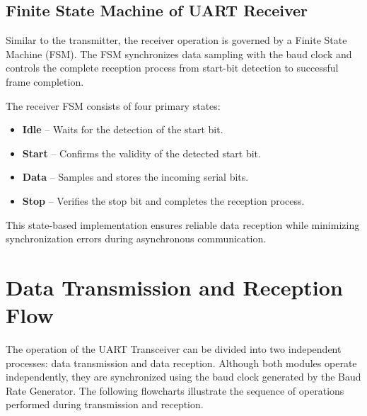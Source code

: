 
\subsection{Finite State Machine of UART Receiver}

Similar to the transmitter, the receiver operation is governed by a Finite State Machine (FSM). The FSM synchronizes data sampling with the baud clock and controls the complete reception process from start-bit detection to successful frame completion.

The receiver FSM consists of four primary states:

\begin{itemize}

\item \textbf{Idle} – Waits for the detection of the start bit.

\item \textbf{Start} – Confirms the validity of the detected start bit.

\item \textbf{Data} – Samples and stores the incoming serial bits.

\item \textbf{Stop} – Verifies the stop bit and completes the reception process.

\end{itemize}

This state-based implementation ensures reliable data reception while minimizing synchronization errors during asynchronous communication.

\clearpage


\section{Data Transmission and Reception Flow}

The operation of the UART Transceiver can be divided into two independent processes: data transmission and data reception. Although both modules operate independently, they are synchronized using the baud clock generated by the Baud Rate Generator. The following flowcharts illustrate the sequence of operations performed during transmission and reception.



